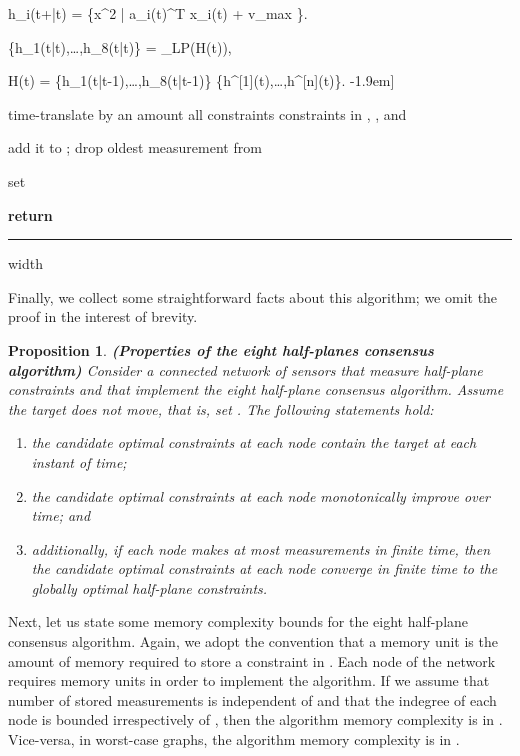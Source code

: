 \documentclass[onecolumn,journal,letterpaper]{IEEEtran}
\newcommand{\real}{{\mathbb{R}}}
\newcommand{\subscr}[2]{{#1}_{\textup{#2}}}
\newcommand{\union}{\cup}
\newcommand{\setdef}[2]{\{#1 \; | \; #2\}}
\newcommand{\supind}[2]{{#1}^{[#2]}}
\newcommand{\subind}[2]{{#1}_{#2}}
\newtheorem{proposition}[theorem]{Proposition}
\newcommand{\PiLP}{\Pi_{\textup{LP}}}
\begin{document}
h_i(t+\tau|t) = \setdef{x\in\real^2}{\subind{a}{i}(t)^T
  x\leq\subind{b}{i}(t) + \subscr{v}{max} \tau}.

  \{h_1(t|t),\dots,h_8(t|t)\} = \PiLP(H(t)),

  H(t) = \{h_1(t|t-1),\dots,h_8(t|t-1)\}\union
  \{\supind{h}{1}(t),\dots,\supind{h}{n}(t)\}.
-1.9em]
\begin{algorithmic}[1]

  \STATE time-translate by an amount   all constraints
  constraints in     , , and
  

  \STATE add it to ; drop oldest
  measurement from 
  \ENDIF

  \STATE set 

  \STATE \textbf{return} 
\end{algorithmic}

\smallskip \hrule width \linewidth \medskip

Finally, we collect some straightforward facts about this algorithm; we
omit the proof in the interest of brevity.

\begin{proposition}\textbf{\textup{(Properties of the eight half-planes consensus algorithm)}}
  Consider a connected network  of sensors that measure
  half-plane constraints and that implement the eight half-plane consensus
  algorithm.  Assume the target does not move, that is, set . The
  following statements hold:
  \begin{enumerate}
  \item the candidate optimal constraints at each node contain the target
    at each instant of time;
  \item the candidate optimal constraints at each node monotonically
    improve over time; and
  \item additionally, if each node makes at most  measurements in finite
    time, then the candidate optimal constraints at each node converge in
    finite time to the globally optimal  half-plane constraints.
  \end{enumerate}
\end{proposition}

Next, let us state some memory complexity bounds for the eight half-plane
consensus algorithm. Again, we adopt the convention that a memory unit is
the amount of memory required to store a constraint in .  Each node 
of the network requires  memory units in order to
implement the algorithm.
If we assume that number  of stored measurements is independent of 
and that the indegree of each node is bounded irrespectively of , then
the algorithm memory complexity is in . Vice-versa, in worst-case
graphs, the algorithm memory complexity is in .
\end{document}
